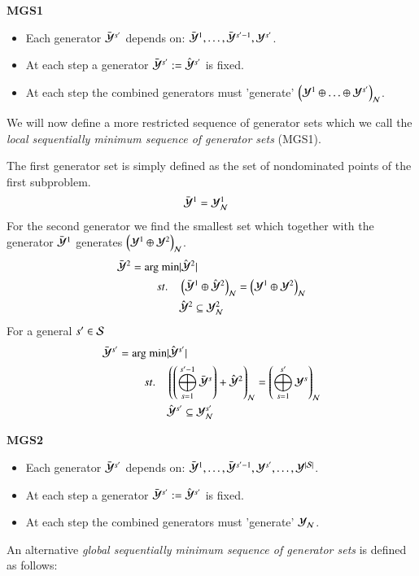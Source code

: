 \begin{enumerate}
\textbf{MGS1}
\begin{itemize}
	\item Each generator $\bY^{s'}$ depends on: $\bY^1, \hdots, \bY^{s'-1}, \Y^{s'} $.
	\item At each step a generator $\bY^{s'} := \hY^{s'}$ is fixed.
	\item At each step the combined generators must 'generate' $\left( \Y^1 \+ \hdots \+ \Y^{s'} \right)_\mcN $.
\end{itemize}
We will now define a more restricted sequence of generator sets which we call the \emph{local sequentially minimum sequence of generator sets} (MGS1).  


The first generator set is simply defined as the set of nondominated points of the first subproblem.
\begin{align}
    \bY^1  &= \Yn^1
\end{align}
For the second generator we find the smallest set which together with the generator $\bY^1$ generates $\left( \Y^1 \+ \Y^2 \right)_\mcN$.
\begin{align}
    \bY^2 = \text{arg min} &\lvert \hY^2 \rvert \\ 
    st. \quad& \left( \bY^1 \+ \hY^2 \right)_\mcN = \left( \Y^1 \+ \Y^2 \right)_\mcN  \nonumber  \\
	     & \hY^2 \subseteq \Yn^2
\end{align}
For a general $s' \in \S$
\begin{align}
    \bY^{s'} = \text{arg min} &\lvert \hY^{s'} \rvert \\ 
    st. \quad& \left( \left( \msum_{s = 1}^{s'-1} \bY^s \right)  + \hY^2 \right)_\mcN = \left( \msum_{s=1}^{s'} \Y^s \right)_\mcN  \nonumber  \\
	     & \hY^{s'} \subseteq \Yn^{s'}
\end{align}

\textbf{MGS2}
\begin{itemize}
	\item Each generator $\bY^{s'}$ depends on: $\bY^1, \hdots, \bY^{s'-1}, \Y^{s'}, \hdots, \Y^{\abs{\S}} $.
	\item At each step a generator $\bY^{s'} := \hY^{s'}$ is fixed.
	\item At each step the combined generators must 'generate' $\Yn $.
\end{itemize}

An alternative \emph{global sequentially minimum sequence of generator sets} is defined as follows:


\end{enumerate}
